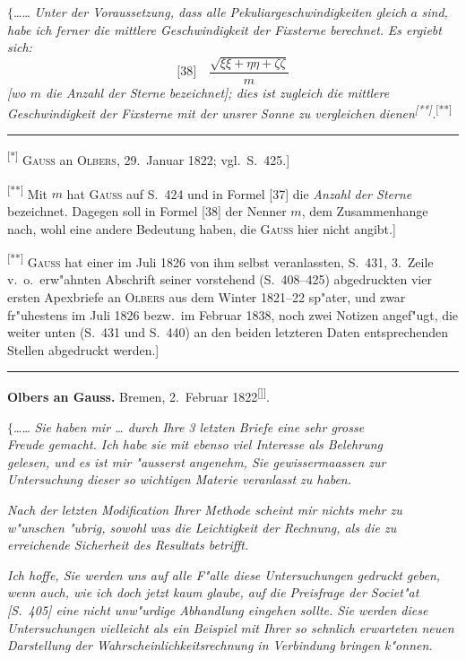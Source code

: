 \documentclass[12pt,a4paper]{article}
\theoremstyle{plain}
\theoremstyle{definition}
\theoremstyle{remark}
\begin{document}
\noindent
$\{$\ldots{}\ldots{} {\itshape Unter der Voraussetzung, dass alle Pekuliargeschwindigkeiten gleich} $a$ {\itshape sind, habe ich ferner die mittlere Geschwindigkeit der Fixsterne berechnet.} {\itshape Es ergiebt sich:}
\[
\text{[38]}\quad \frac{\sqrt{\xi\xi + \eta\eta + \zeta\zeta}}{m}
\]
{\itshape [wo $m$ die Anzahl der Sterne bezeichnet]; dies ist zugleich die mittlere} {\itshape Geschwindigkeit der Fixsterne mit der unsrer Sonne zu vergleichen} {\itshape dienen\textsuperscript{[**]}.}\textsuperscript{[**]}

\rule{\textwidth}{0.4pt}
{\small
\textsuperscript{[*]} \textsc{Gauss} an \textsc{Olbers}, 29.\ Januar 1822; vgl.\ S.\ 425.]

\textsuperscript{[**]} Mit $m$ hat \textsc{Gauss} auf S.\ 424 und in Formel [37] die {\itshape Anzahl der Sterne} bezeichnet. Dagegen soll in Formel [38] der Nenner $m$, dem Zusammenhange nach, wohl eine andere Bedeutung haben, die \textsc{Gauss} hier nicht angibt.]

\textsuperscript{[**]} \textsc{Gauss} hat einer im Juli 1826 von ihm selbst veranlassten, S.\ 431, 3.\ Zeile v.\ o.\ erw"ahnten Abschrift seiner vorstehend (S.\ 408--425) abgedruckten vier ersten \glq{}Apexbriefe\grq{} an \textsc{Olbers} aus dem Winter 1821--22 sp"ater, und zwar fr"uhestens im Juli 1826 bezw.\ im Februar 1838, noch zwei Notizen angef"ugt, die weiter unten (S.\ 431 und S.\ 440) an den beiden letzteren Daten entsprechenden Stellen abgedruckt werden.]
}
\rule{\textwidth}{0.4pt}


\newpage
\begin{center}
\textbf{Olbers an Gauss.} \quad Bremen, 2.\ Februar 1822\textsuperscript{[\textdagger]]}.
\end{center}

\noindent
$\{$\ldots{}\ldots{} {\itshape Sie haben mir \ldots{} durch Ihre 3 letzten Briefe eine sehr grosse} \\ {\itshape Freude gemacht. Ich habe sie mit ebenso viel Interesse als Belehrung} \\ {\itshape gelesen, und es ist mir "ausserst angenehm, Sie gewissermaassen zur} \\ {\itshape Untersuchung dieser so wichtigen Materie veranlasst zu haben.}

{\itshape Nach der letzten Modification Ihrer Methode scheint mir nichts mehr zu w"unschen "ubrig, sowohl was die Leichtigkeit der Rechnung, als die zu erreichende Sicherheit des Resultats betrifft.}

{\itshape Ich hoffe, Sie werden uns auf alle F"alle diese Untersuchungen gedruckt geben, wenn auch, wie ich doch jetzt kaum glaube, auf die Preisfrage der Societ"at [S.\ 405] eine nicht unw"urdige Abhandlung eingehen sollte. Sie werden diese Untersuchungen vielleicht als ein Beispiel mit Ihrer so sehnlich erwarteten neuen Darstellung der Wahrscheinlichkeitsrechnung in Verbindung bringen k"onnen.}
\end{document}
